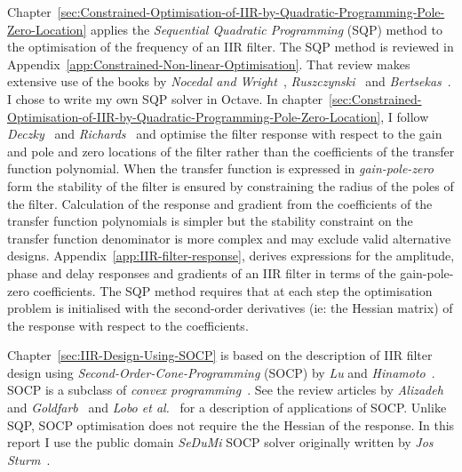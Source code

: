 \documentclass[a4paper,twoside,10pt,english]{report}
\begin{document}
Chapter~\ref{sec:Constrained-Optimisation-of-IIR-by-Quadratic-Programming-Pole-Zero-Location}
applies the \emph{Sequential Quadratic Programming} (SQP) method to the
optimisation of the frequency of an IIR filter. The SQP method is reviewed in
Appendix~\ref{app:Constrained-Non-linear-Optimisation}. That review makes
extensive use of the books by \emph{Nocedal and
  Wright}~\cite{NocedalWright_NumericalOptimization},
\emph{Ruszczynski}~\cite{Ruszczynski_NonlinearOptimization} and
\emph{Bertsekas}~\cite{Bertsekas_NonlinearProgramming}.  I chose to write my
own SQP solver in Octave.  In
chapter~\ref{sec:Constrained-Optimisation-of-IIR-by-Quadratic-Programming-Pole-Zero-Location},
I follow \emph{Deczky}~\cite{Deczky_MinPSynthesisIIRDigitalFilters} and
\emph{Richards}~\cite{Richards_DeczkyRecursiveDecimator} and optimise the
filter response with respect to the gain and pole and zero locations of the
filter rather than the coefficients of the transfer function polynomial. When
the transfer function is expressed in \emph{gain-pole-zero} form the stability
of the filter is ensured by constraining the radius of the poles of the
filter.  Calculation of the response and gradient from the coefficients of the
transfer function polynomials is simpler but the stability constraint on the
transfer function denominator is more complex and may exclude valid
alternative designs. Appendix~\ref{app:IIR-filter-response}, derives
expressions for the amplitude, phase and delay responses and gradients of an
IIR filter in terms of the gain-pole-zero coefficients. The SQP method
requires that at each step the optimisation problem is initialised with the
second-order derivatives (ie: the Hessian matrix) of the response with respect
to the coefficients.

Chapter~\ref{sec:IIR-Design-Using-SOCP} is based on the description of IIR
filter design using \emph{Second-Order-Cone-Programming} (SOCP) by \emph{Lu} and 
\emph{Hinamoto}~\cite{LuHinamoto_IIRFrequencyMaskingFiltersConeProgramming}. 
SOCP is a subclass of 
\emph{convex programming}~\cite{BoydVandenberghe_ConvexOptimization}. See the 
review articles by \emph{Alizadeh} and 
\emph{Goldfarb}~\cite{AlizadehGoldfarb_SecondOrderCone} and 
\emph{Lobo et al.}~\cite{LoboVandenbergheBoydLebret_ApplicationsSecondOrderConeProgramming} 
for a description of applications of SOCP. Unlike SQP, SOCP optimisation does not
require the the Hessian of the response. In this report I use the public domain
\emph{SeDuMi} SOCP solver originally written by 
\emph{Jos Sturm}~\cite{Sturm_SeDuMi_1_3}. 
\end{document}
